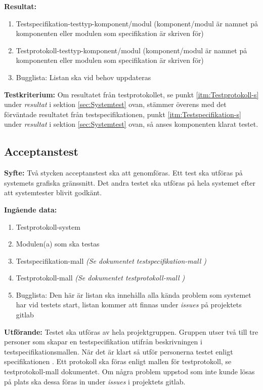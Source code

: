 \documentclass[a4paper,10pt, twoside]{article}
\begin{document}
\textbf{Resultat:}
    \begin{enumerate}
        \item \label{itm:Testspecifikation-s}
        Testspecifikation-testtyp-komponent/modul (komponent/modul är namnet på
        komponenten eller modulen som specifikation är skriven för)
        \item \label{itm:Testprotokoll-s} Testprotokoll-testtyp-komponent/modul
        (komponent/modul är namnet på komponenten eller modulen som
        specifikation är skriven för)
        \item Bugglista: Listan ska vid behov uppdateras
    \end{enumerate}

\textbf{Testkriterium:} Om resultatet från testprotokollet, se punkt
\ref{itm:Testprotokoll-s} under \emph{resultat} i sektion \ref{sec:Systemtest}
ovan, stämmer överens med det förväntade resultatet från testspecifikationen,
punkt \ref{itm:Testspecifikation-s} under \emph{resultat} i sektion
\ref{sec:Systemtest} ovan, så anses komponenten klarat testet.

\subsection{Acceptanstest}
\textbf{Syfte:}
Två stycken acceptanstest ska att genomföras. Ett test ska utföras på systemets
grafiska gränssnitt.  Det andra testet ska utföras på hela systemet efter att
systemtester blivit godkänt.

\textbf{Ingående data:}
        \begin{enumerate}
            \item Testprotokoll-system
            \item Modulen(a) som ska testas
            \item Testspecifikation-mall
            \emph{(Se dokumentet testspecifikation-mall \cite{testspec-mall})}
            \item Testprotokoll-mall \emph{(Se
            dokumentet testprotokoll-mall \cite{testprot-mall})}
            \item Bugglista: Den här är listan ska innehålla alla kända problem
            som systemet har vid testets start, listan kommer att finnas under
            \emph{issues} på projektets gitlab
        \end{enumerate}

\textbf{Utförande:} Testet ska utföras av hela projektgruppen. Gruppen utser
två till tre personer som skapar en testspecifikation utifrån beskrivningen i
testspecifikationsmallen. När det är klart så utför personerna testet enligt
specifikationen \cite{kravspec}. Ett protokoll ska föras enligt mallen för
testprotokoll, se testprotokoll-mall dokumentet. Om några problem uppstod som
inte kunde lösas på plats ska dessa föras in under \emph{issues} i projektets
gitlab.
\end{document}
